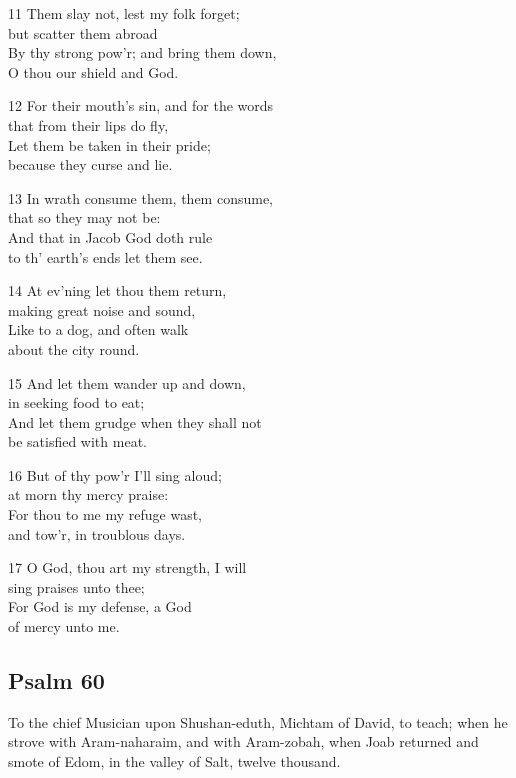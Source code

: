 11 Them slay not, lest my folk forget;\\
but scatter them abroad\\
By thy strong pow’r; and bring them down,\\
O thou our shield and God.

12 For their mouth’s sin, and for the words\\
that from their lips do fly,\\
Let them be taken in their pride;\\
because they curse and lie.

13 In wrath consume them, them consume,\\
that so they may not be:\\
And that in Jacob God doth rule\\
to th’ earth’s ends let them see.

14 At ev’ning let thou them return,\\
making great noise and sound,\\
Like to a dog, and often walk\\
about the city round.

15 And let them wander up and down,\\
in seeking food to eat;\\
And let them grudge when they shall not\\
be satisfied with meat.

16 But of thy pow’r I’ll sing aloud;\\
at morn thy mercy praise:\\
For thou to me my refuge wast,\\
and tow’r, in troublous days.

17 O God, thou art my strength, I will\\
sing praises unto thee;\\
For God is my defense, a God\\
of mercy unto me.

\begin{center}
\quad{}\quad{}
\end{center}

\subsection*{Psalm 60}
To the chief Musician upon Shushan-eduth, Michtam of David, to teach; when he strove with Aram-naharaim, and with Aram-zobah, when Joab returned and smote of Edom, in the valley of Salt, twelve thousand.

